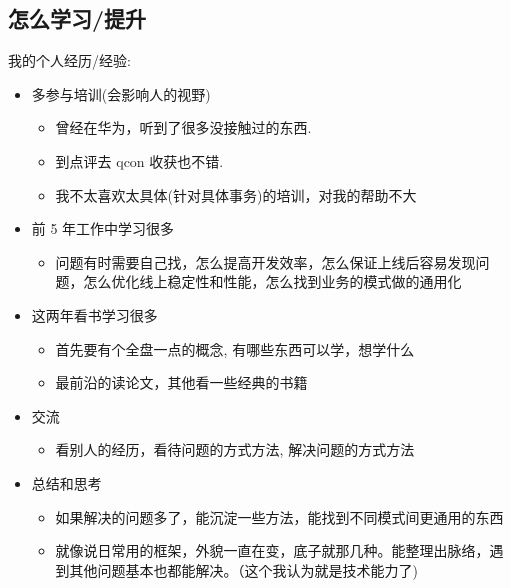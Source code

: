 \documentclass[11pt,a4paper]{article}
\begin{document}
\subsection{怎么学习/提升}
\label{sec:org8d64f3f}
我的个人经历/经验:
\begin{itemize}
\item 多参与培训(会影响人的视野)
\begin{itemize}
\item 曾经在华为，听到了很多没接触过的东西.
\item 到点评去 qcon 收获也不错.
\item 我不太喜欢太具体(针对具体事务)的培训，对我的帮助不大
\end{itemize}
\item 前 5 年工作中学习很多
\begin{itemize}
\item 问题有时需要自己找，怎么提高开发效率，怎么保证上线后容易发现问题，怎么优化线上稳定性和性能，怎么找到业务的模式做的通用化
\end{itemize}
\item 这两年看书学习很多
\begin{itemize}
\item 首先要有个全盘一点的概念, 有哪些东西可以学，想学什么
\item 最前沿的读论文，其他看一些经典的书籍
\end{itemize}
\item 交流
\begin{itemize}
\item 看别人的经历，看待问题的方式方法, 解决问题的方式方法
\end{itemize}
\item 总结和思考
\begin{itemize}
\item 如果解决的问题多了，能沉淀一些方法，能找到不同模式间更通用的东西
\item 就像说日常用的框架，外貌一直在变，底子就那几种。能整理出脉络，遇到其他问题基本也都能解决。（这个我认为就是技术能力了)
\end{itemize}
\end{itemize}
\end{document}
